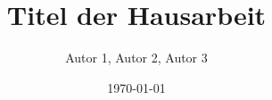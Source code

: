 



\pagestyle{empty}



\titlehead{Freie Universität Berlin\\
           Fachbereich Geowissenschaften\\
           Institut für Geographische Wissenschaften}

\subject{Hausarbeit}

\title{Titel der Hausarbeit}


\author{Autor 1, Autor 2, Autor 3}

\date{\today} 

\publishers{Dozenten:\\Prof. Dr. Dozent 1\\Prof. Dr. Dozent 2}





\maketitle %
\clearpage


\pagestyle{scrheadings}    %
\clearscrheadfoot

\cfoot{\pagemark}
\chead{\headmark}


\tableofcontents

\newpage

\listoffigures

\listoftables

